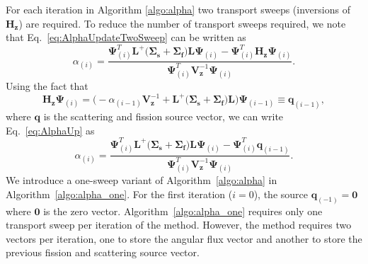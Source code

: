 For each iteration in Algorithm \ref{algo:alpha} two transport sweeps (inversions of $\mathbf{H_{z}}$) are required. To reduce the number of transport sweeps required, we note that Eq.~\ref{eq:AlphaUpdateTwoSweep} can be written as
\begin{equation}
	\alpha_{(i)} = \frac{ \mathbf{\Psi}^{T}_{(i)} \mathbf{L}^{+} \big ( \mathbf{\Sigma_{s}} + \mathbf{\Sigma_{f}} \big ) \mathbf{L} \mathbf{\Psi}_{(i)} -  \mathbf{\Psi}^{T}_{(i)}  \mathbf{H_{z}} \mathbf{\Psi}_{(i)}}{  \mathbf{\Psi}^{T}_{(i)} \mathbf{V}^{-1}_{\mathbf{z}}  \mathbf{\Psi}_{(i)}}.
	\label{eq:AlphaUp}
\end{equation}
Using the fact that 
\begin{equation}
\mathbf{H_{z}} \mathbf{\Psi}_{(i)} =  \bigg ( -\alpha_{(i-1)} \mathbf{V}_{\mathbf{z}}^{-1} + \mathbf{L}^{+} \big ( \mathbf{\Sigma_{s}} + \mathbf{\Sigma_{f}} \big ) \mathbf{L} \bigg ) \mathbf{\Psi}_{(i-1)} \equiv \mathbf{q}_{(i-1)},
\end{equation}
where $\mathbf{q}$ is the scattering and fission source vector, we can write Eq.~\ref{eq:AlphaUp} as
\begin{equation}
	\alpha_{(i)} = \frac{ \mathbf{\Psi}^{T}_{(i)} \mathbf{L}^{+} \big ( \mathbf{\Sigma_{s}} + \mathbf{\Sigma_{f}} \big ) \mathbf{L} \mathbf{\Psi}_{(i)} -  \mathbf{\Psi}^{T}_{(i)}  \mathbf{q}_{(i-1)}}{  \mathbf{\Psi}^{T}_{(i)} \mathbf{V}^{-1}_{\mathbf{z}}  \mathbf{\Psi}_{(i)}}.
\end{equation}
We introduce a one-sweep variant of Algorithm~\ref{algo:alpha} in Algorithm~\ref{algo:alpha_one}. For the first iteration ($i=0$), the source $\mathbf{q}_{(-1)} = \mathbf{0}$ where $\mathbf{0}$ is the zero vector. Algorithm~\ref{algo:alpha_one} requires only one transport sweep per iteration of the method. However, the method requires two vectors per iteration, one to store the angular flux vector and another to store the previous fission and scattering source vector.
